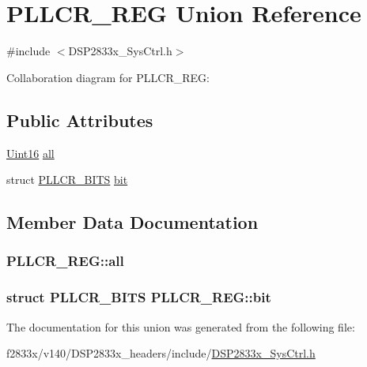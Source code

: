 \hypertarget{union_p_l_l_c_r___r_e_g}{}\section{P\+L\+L\+C\+R\+\_\+\+R\+E\+G Union Reference}
\label{union_p_l_l_c_r___r_e_g}


{\ttfamily \#include $<$D\+S\+P2833x\+\_\+\+Sys\+Ctrl.\+h$>$}



Collaboration diagram for P\+L\+L\+C\+R\+\_\+\+R\+E\+G\+:
\subsection*{Public Attributes}
\begin{DoxyCompactItemize}
\item 
\hyperlink{_d_s_p2833x___device_8h_a59a9f6be4562c327cbfb4f7e8e18f08b}{Uint16} \hyperlink{union_p_l_l_c_r___r_e_g_ab5d69564dc97b4c9db0964f748b79f36}{all}
\item 
struct \hyperlink{struct_p_l_l_c_r___b_i_t_s}{P\+L\+L\+C\+R\+\_\+\+B\+I\+T\+S} \hyperlink{union_p_l_l_c_r___r_e_g_a1eb34e9269da5517292176dd544c7e85}{bit}
\end{DoxyCompactItemize}


\subsection{Member Data Documentation}
\hypertarget{union_p_l_l_c_r___r_e_g_ab5d69564dc97b4c9db0964f748b79f36}{}
\subsubsection[{all}]{ P\+L\+L\+C\+R\+\_\+\+R\+E\+G\+::all}\label{union_p_l_l_c_r___r_e_g_ab5d69564dc97b4c9db0964f748b79f36}
\hypertarget{union_p_l_l_c_r___r_e_g_a1eb34e9269da5517292176dd544c7e85}{}
\subsubsection[{bit}]{\setlength{\rightskip}{0pt plus 5cm}struct {\bf P\+L\+L\+C\+R\+\_\+\+B\+I\+T\+S} P\+L\+L\+C\+R\+\_\+\+R\+E\+G\+::bit}\label{union_p_l_l_c_r___r_e_g_a1eb34e9269da5517292176dd544c7e85}


The documentation for this union was generated from the following file\+:\begin{DoxyCompactItemize}
\item 
f2833x/v140/\+D\+S\+P2833x\+\_\+headers/include/\hyperlink{_d_s_p2833x___sys_ctrl_8h}{D\+S\+P2833x\+\_\+\+Sys\+Ctrl.\+h}\end{DoxyCompactItemize}

